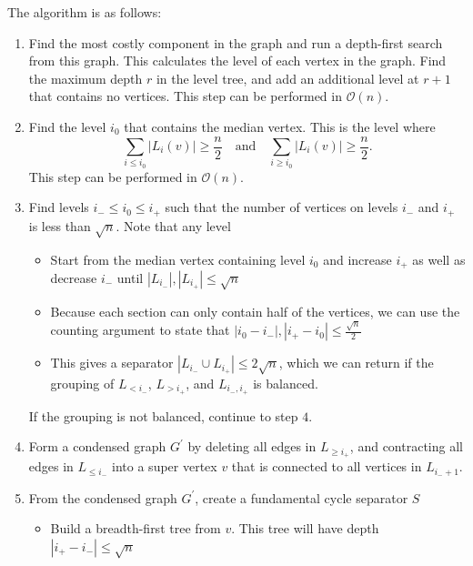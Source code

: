 \documentclass[12pt]{article}
\begin{document}
    The algorithm is as follows:
    \begin{enumerate}

        \item Find the most costly component in the graph and run a depth-first search from this graph. This calculates the level of each vertex in the graph. Find the maximum depth $r$ in the level tree, and add an additional level at $r+1$ that contains no vertices. This step can be performed in $\mathcal{O}(n)$.

        \item Find the level $i_0$ that contains the median vertex. This is the level where
\[
\sum_{i \leq i_0} |L_i(v)| \geq \frac{n}{2} \quad \text{and}\quad \sum_{i \geq i_0} |L_i(v)| \geq \frac{n}{2}.
\]
This step can be performed in $\mathcal{O}(n)$.

        \item Find levels $i_- \leq i_0 \leq i_+$ such that the number of vertices on levels $i_-$ and $i_+$ is less than $\sqrt{n}$. Note that any level
        \begin{itemize}
            \item Start from the median vertex containing level $i_0$ and increase $i_+$ as well as decrease $i_-$ until $|L_{i_-}|,|L_{i_+}| \leq \sqrt{n}$

            \item Because each section can only contain half of the vertices, we can use the counting argument to state that $|i_0 - i_-|,|i_+ - i_0| \leq \frac{\sqrt{n}}{2}$

            \item This gives a separator $|L_{i_-} \cup L_{i_+}| \leq 2 \sqrt{n}$, which we can return if the grouping of $L_{< i_-}$, $L_{> i_+}$, and $L_{i_-,i_+}$ is balanced.
        \end{itemize}
        If the grouping is not balanced, continue to step $4$.

        \item Form a condensed graph $G^{'}$ by deleting  all edges in $L_{\geq i_+}$, and contracting all edges in $L_{\leq i_-}$ into a super vertex $v$ that is connected to all vertices in $L_{i_- + 1}$.

        \item From the condensed graph $G^{'}$, create a fundamental cycle separator $S$
        \begin{itemize}
            \item Build a breadth-first tree from $v$. This tree will have depth $|i_+ - i_-| \leq \sqrt{n}$


\end{itemize}
\end{enumerate}
\end{document}
